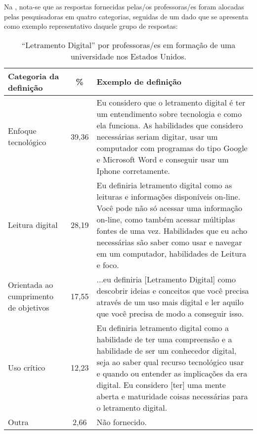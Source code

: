 \documentclass[portuguese]{textolivre}
\begin{document}
Na , nota-se que as respostas fornecidas pelas/os professoras/es foram alocadas pelas pesquisadoras em quatro categorias, seguidas de um dado que se apresenta como exemplo representativo daquele grupo de respostas:


\begin{table}[h!]
\centering
\begin{threeparttable}
\caption{“Letramento Digital” por professoras/es em formação de uma universidade nos Estados Unidos.}
\label{Tabela01}
\begin{tabular}{p{}cp{}}
\toprule
Categoria da definição & \% & Exemplo de definição \\
\midrule
Enfoque tecnológico\protect\footnotemark & 39,36 & Eu considero que o letramento digital é ter um entendimento sobre tecnologia e como ela funciona. As habilidades que considero necessárias seriam digitar, usar um computador com programas do tipo Google e Microsoft Word e conseguir usar um Iphone corretamente. \\
Leitura digital\protect\footnotemark & 28,19 & Eu definiria letramento digital como as leituras e informações disponíveis on-line. Você pode não só acessar uma informação on-line, como também acessar múltiplas fontes de uma vez. Habilidades que eu acho necessárias são saber como usar e navegar em um computador, habilidades de Leitura e foco. \\
Orientada ao cumprimento de objetivos\protect\footnotemark & 17,55 & ...eu definiria [Letramento Digital] como descobrir ideias e conceitos que você precisa através de um uso mais digital e ler aquilo que você precisa de modo a conseguir isso.\\
Uso crítico\protect\footnotemark & 12,23 & Eu definiria letramento digital como a habilidade de ter uma compreensão e a habilidade de ser um conhecedor digital, seja ao saber qual recurso tecnológico usar e quando ou entender as implicações da era digital. Eu considero [ter] uma mente aberta e maturidade coisas necessárias para o letramento digital.\\
Outra & 2,66 & Não fornecido. \\
\bottomrule
\end{tabular}
\end{threeparttable}
\end{table}
\addtocounter{footnote}{-4} 
\end{document}
